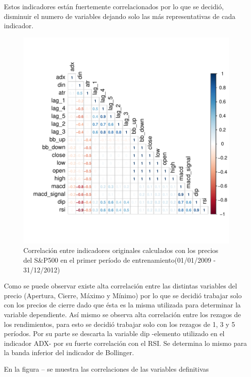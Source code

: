\documentclass[a4paper,12pt]{Latex/Classes/PhDthesisPSnPDF}
\begin{document}
Estos indicadores están fuertemente correlacionados por lo que se decidió, disminuir el numero de variables dejando solo las más representativas de cada indicador.

\begin{figure}[H]
\centering
\includegraphics{main-003}
\caption{Correlación entre indicadores originales calculados con los precios del S&P500 en el primer período de entrenamiento(01/01/2009 - 31/12/2012)}
\end{figure}

Como se puede observar existe alta correlación entre las distintas variables del precio (Apertura, Cierre, Máximo y Mínimo) por lo que se decidió trabajar solo con los precios de cierre dado que ésta es la misma utilizada para determinar la variable dependiente. Así mismo se observa alta correlación entre los rezagos de los rendimientos, para esto se decidió trabajar solo con los rezagos de 1, 3 y 5 períodos. Por su parte se descarta la variable dip -elemento utilizado en el indicador ADX- por su fuerte correlación con el RSI. Se determina lo mismo para la banda inferior del indicador de Bollinger.

En la figura -- se muestra las correlaciones de las variables definitivas
\end{document}
